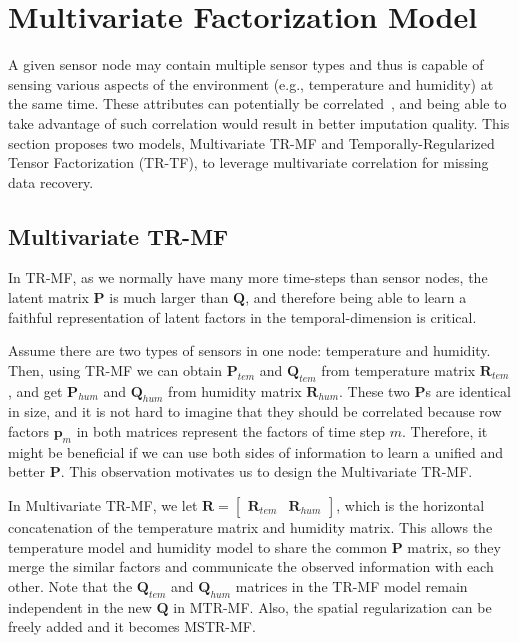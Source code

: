 
\section{Multivariate Factorization Model} \label{sec:tf}
A given sensor node may contain multiple sensor types and thus is capable of sensing various aspects of the environment (e.g., temperature and humidity) at the same time.
These attributes can potentially be correlated~\cite{deshpande2005}, and being able to take advantage of such correlation would result in better imputation quality.
This section proposes two models, Multivariate TR-MF and Temporally-Regularized Tensor Factorization (TR-TF), to leverage multivariate correlation for missing data recovery.

\subsection{Multivariate TR-MF} %
In TR-MF, as we normally have many more time-steps than sensor nodes, the latent matrix $\mathbf{P}$ is much larger than $\mathbf{Q}$, and therefore being able to learn a faithful representation of latent factors in the temporal-dimension is critical. 

Assume there are two types of sensors in one node: temperature and humidity.
Then, using TR-MF we can obtain $\mathbf{P}_{tem}$ and $\mathbf{Q}_{tem}$ from temperature matrix $\mathbf{R}_{tem}$, and get $\mathbf{P}_{hum}$ and $\mathbf{Q}_{hum}$ from humidity matrix $\mathbf{R}_{hum}$.
These two $\mathbf{P}$s are identical in size, and it is not hard to imagine that they should be correlated because row factors $\mathbf{p}_m$ in both matrices represent the factors of time step $m$.
Therefore, it might be beneficial if we can use both sides of information to learn a unified and better $\mathbf{P}$.
This observation motivates us to design the Multivariate TR-MF.

In Multivariate TR-MF, we let 
$\mathbf{R} = \begin{bmatrix}\mathbf{R}_{tem} & \mathbf{R}_{hum} \end{bmatrix}$,
which is the horizontal concatenation of the temperature matrix and humidity matrix.
This allows the temperature model and humidity model to share the common $\mathbf{P}$ matrix, so they merge the similar factors and communicate the observed information with each other.
Note that the $\mathbf{Q}_{tem}$ and $\mathbf{Q}_{hum}$ matrices in the TR-MF model remain independent in the new $\mathbf{Q}$ in MTR-MF.
Also, the spatial regularization can be freely added and it becomes MSTR-MF.

